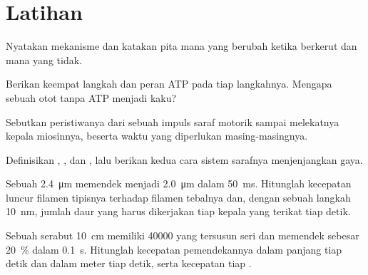 \section{Latihan}

\begin{exercise}[$\star$]\label{exo:b2:muscle-movement:1}
Nyatakan mekanisme  dan katakan pita  mana
yang berubah ketika berkerut dan mana yang tidak.
\end{exercise}

\begin{exercise}[$\star$]\label{exo:b2:muscle-movement:2}
Berikan keempat langkah  dan peran ATP pada tiap
langkahnya. Mengapa sebuah otot tanpa ATP menjadi kaku?
\end{exercise}

\begin{exercise}[$\star$]\label{exo:b2:muscle-movement:3}
Sebutkan peristiwanya dari sebuah impuls saraf motorik sampai
melekatnya kepala miosinnya, beserta waktu yang diperlukan
masing-masingnya.
\end{exercise}

\begin{exercise}[$\star$]\label{exo:b2:muscle-movement:4}
Definisikan , , dan , lalu berikan kedua cara
sistem sarafnya menjenjangkan gaya.
\end{exercise}

\begin{exercise}[$\star\star$]\label{exo:b2:muscle-movement:5}
Sebuah  \qty{2.4}{\micro m} memendek menjadi \qty{2.0}{\micro m}
dalam \qty{50}{ms}. Hitunglah kecepatan luncur filamen tipisnya
terhadap filamen tebalnya dan, dengan sebuah langkah \qty{10}{nm},
jumlah daur yang harus dikerjakan tiap kepala yang terikat tiap detik.
\end{exercise}

\begin{exercise}[$\star\star$]\label{exo:b2:muscle-movement:6}
Sebuah serabut \qty{10}{cm} memiliki \num{40000}  yang
tersusun seri dan memendek sebesar \qty{20}{\%} dalam \qty{0.1}{s}.
Hitunglah kecepatan pemendekannya dalam panjang tiap detik dan dalam
meter tiap detik, serta kecepatan tiap .
\end{exercise}

